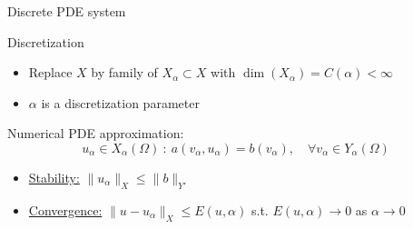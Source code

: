 \begin{frame}{Discrete PDE system}

  \begin{block}{Discretization}

    \begin{itemize}

      \item Replace $X$ by family of $X_\alpha \subset X$ with $\dim(X_\alpha) = C(\alpha) < \infty$

      \item $\alpha$ is a discretization parameter



    \end{itemize}

  \end{block}

Numerical PDE approximation:
$$
u_\alpha \in X_\alpha(\Omega) \ : \ a(v_\alpha,u_\alpha) = b(v_\alpha), \quad \forall v_\alpha \in Y_\alpha(\Omega)
$$

\begin{itemize}
  \item \underline{Stability:} $\| u_\alpha \|_{X} \leq \| b \|_{Y'}$%
  \item \underline{Convergence:} $\| u - u_\alpha \|_{X} \leq E(u,\alpha)$ s.t. $E(u,\alpha) \to 0$ as $\alpha \to 0$
\end{itemize}

%
\end{frame}


